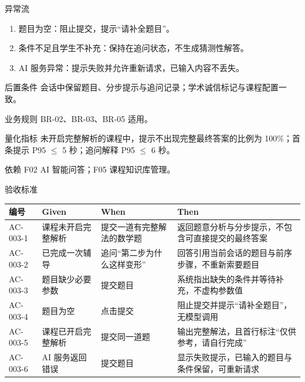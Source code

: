 \documentclass[12pt,a4paper]{ctexart}
\newenvironment{reqcard}
  {\begin{description}[leftmargin=6.2em,style=nextline,itemsep=4pt]}
  {\end{description}}
\begin{document}
\begin{reqcard}
  \item[异常流]
    \begin{enumerate}[label=E\arabic*,leftmargin=2.6em]
      \item 题目为空：阻止提交，提示“请补全题目”。
      \item 条件不足且学生不补充：保持在追问状态，不生成猜测性解答。
      \item AI 服务异常：提示失败并允许重新请求，已输入内容不丢失。
    \end{enumerate}
  \item[后置条件] 会话中保留题目、分步提示与追问记录；学术诚信标记与课程配置一致。
  \item[业务规则] BR-02、BR-03、BR-05 适用。
  \item[量化指标] 未开启完整解析的课程中，提示不出现完整最终答案的比例为 100\%；首条提示 P95 $\leq$ 5 秒；追问解释 P95 $\leq$ 6 秒。
  \item[依赖] F02 AI 智能问答；F05 课程知识库管理。
  \item[验收标准]
\end{reqcard}

\begin{longtable}{@{}C{2.1cm}L{4.2cm}L{4.4cm}L{4.0cm}@{}}
  \toprule
  \textbf{编号} & \textbf{Given} & \textbf{When} & \textbf{Then} \\
  \midrule
  \endhead
  AC-003-1 & 课程未开启完整解析 & 提交一道有完整解法的数学题 & 返回题意分析与分步提示，不包含可直接提交的最终答案 \\
  AC-003-2 & 已完成一次辅导 & 追问“第二步为什么这样变形” & 回答引用当前会话的题目与前序步骤，不重新索要题目 \\
  AC-003-3 & 题目缺少必要参数 & 提交题目 & 系统指出缺失的条件并等待补充，不虚构参数值 \\
  AC-003-4 & 题目为空 & 点击提交 & 阻止提交并提示“请补全题目”，无模型调用 \\
  AC-003-5 & 课程已开启完整解析 & 提交同一道题 & 输出完整解法，且首行标注“仅供参考，请自行完成” \\
  AC-003-6 & AI 服务返回错误 & 提交题目 & 显示失败提示，已输入的题目与条件保留，可重新请求 \\
  \bottomrule
\end{longtable}
\end{document}
